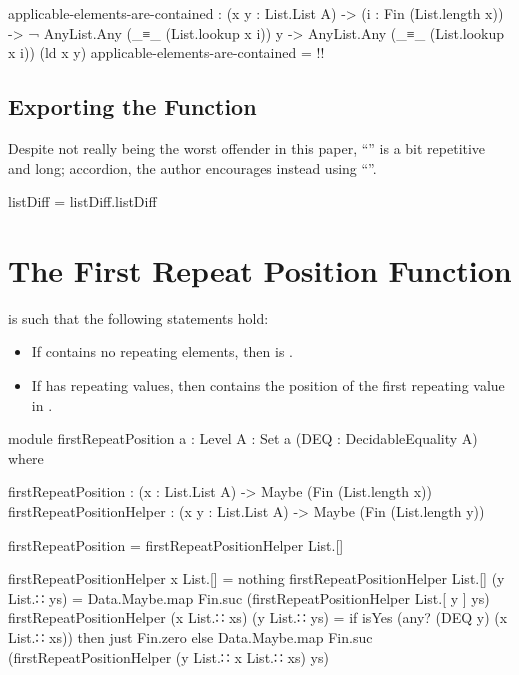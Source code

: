 \documentclass{report}
\begin{document}
\begin{code}
    applicable-elements-are-contained :
      (x y : List.List A) ->
      (i : Fin (List.length x)) ->
      ¬ AnyList.Any (_≡_ (List.lookup x i)) y ->
      AnyList.Any (_≡_ (List.lookup x i)) (ld x y)
    applicable-elements-are-contained = {!!}
\end{code}

\subsection{Exporting the Function}
Despite not really being the worst offender in this paper, ``'' is a bit repetitive and long; accordion, the author encourages instead using ``''.

\begin{code}
listDiff = listDiff.listDiff
\end{code}

\section{The First Repeat Position Function}
 is such that the following statements hold:

\begin{itemize}
  \item If  contains no repeating elements, then    is .
  \item If  has repeating values, then    contains the position of the first repeating value in .
\end{itemize}

\begin{code}
module firstRepeatPosition
  {a : Level}
  {A : Set a}
  (DEQ : DecidableEquality A) where

  firstRepeatPosition : (x : List.List A) -> Maybe (Fin (List.length x))
  firstRepeatPositionHelper : (x y : List.List A) -> Maybe (Fin (List.length y))

  firstRepeatPosition = firstRepeatPositionHelper List.[]

  firstRepeatPositionHelper x List.[] = nothing
  firstRepeatPositionHelper List.[] (y List.∷ ys) =
    Data.Maybe.map Fin.suc (firstRepeatPositionHelper List.[ y ] ys)
  firstRepeatPositionHelper (x List.∷ xs) (y List.∷ ys) =
    if isYes (any? (DEQ y) (x List.∷ xs))
      then just Fin.zero
      else Data.Maybe.map Fin.suc (firstRepeatPositionHelper (y List.∷ x List.∷ xs) ys)
\end{code}
\end{document}

